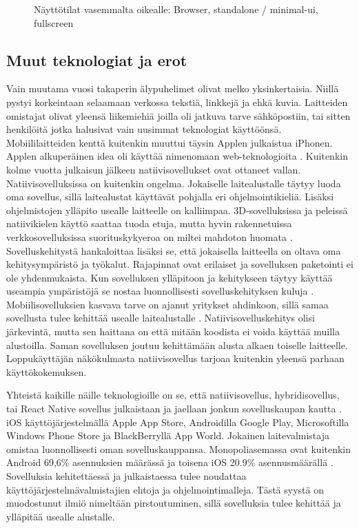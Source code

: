 \documentclass{tktltiki}
\begin{document}
\begin{figure}[h]
\begin{center}
\caption{Näyttötilat vasemmalta oikealle: Browser, standalone / minimal-ui, fullscreen}
\label{Näyttötilat}
\end{center}
\end{figure}
\clearpage

\subsection{Muut teknologiat ja erot}

Vain muutama vuosi takaperin älypuhelimet olivat melko yksinkertaisia. Niillä pystyi korkeintaan selaamaan verkossa tekstiä, linkkejä ja ehkä kuvia. Laitteiden omistajat olivat yleensä liikemiehiä joilla oli jatkuva tarve sähköpostiin, tai sitten henkilöitä jotka halusivat vain uusimmat teknologiat käyttöönsä. Mobiililaitteiden kenttä kuitenkin muuttui täysin Applen julkaistua iPhonen. Applen alkuperäinen idea oli käyttää nimenomaan web-teknologioita \cite{charland2011mobile}. Kuitenkin kolme vuotta julkaisun jälkeen natiivisovellukset ovat ottaneet vallan. Natiivisovelluksissa on kuitenkin ongelma. Jokaiselle laitealustalle täytyy luoda oma sovellus, sillä laitealustat käyttävät pohjalla eri ohjelmointikieliä. Lisäksi ohjelmistojen ylläpito usealle laitteelle on kalliimpaa. 3D-sovelluksissa ja peleissä natiivikielen käyttö saattaa tuoda etuja, mutta hyvin rakennetuissa verkkosovelluksissa suorituskykyeroa on miltei mahdoton huomata \cite{charland2011mobile}. Sovelluskehitystä hankaloittaa lisäksi se, että jokaisella laitteella on oltava oma kehitysympäristö ja työkalut. Rajapinnat ovat erilaiset ja sovelluksen paketointi ei ole yhdenmukaista. Kun sovelluksen ylläpitoon ja kehitykseen täytyy käyttää useampia ympäristöjä se nostaa luonnollisesti sovelluskehityksen kuluja \cite{xanthopoulos2013comparative}. Mobiilisovelluksien kasvava tarve on ajanut yritykset ahdinkoon, sillä samaa sovellusta tulee kehittää usealle laitealustalle \cite{xanthopoulos2013comparative}. Natiivisovelluskehitys olisi järkevintä, mutta sen haittana on että mitään koodista ei voida käyttää muilla alustoilla. Saman sovelluksen joutuu kehittämään alusta alkaen toiselle laitteelle. Loppukäyttäjän näkökulmasta natiivisovellus tarjoaa kuitenkin yleensä parhaan käyttökokemuksen.

Yhteistä kaikille näille teknologioille on se, että natiivisovellus, hybridisovellus, tai React Native sovellus julkaistaan ja jaellaan jonkun sovelluskaupan kautta \cite{xanthopoulos2013comparative}. iOS käyttöjärjestelmällä Apple App Store, Androidilla Google Play, Microsoftilla Windows Phone Store ja BlackBerryllä App World. Jokainen laitevalmistaja omistaa luonnollisesti oman sovelluskauppansa. Monopoliasemassa ovat kuitenkin Android 69,6\% asennuksien määrässä ja toisena iOS 20.9\% asennusmäärällä \cite{xanthopoulos2013comparative}. Sovelluksia kehitettäessä ja julkaistaessa tulee noudattaa käyttöjärjestelmävalmistajien ehtoja ja ohjelmointimalleja. Tästä syystä on muodostunut ilmiö nimeltään pirstoutuminen, sillä sovelluksia tulee kehittää ja ylläpitää usealle alustalle. 
\end{document}
